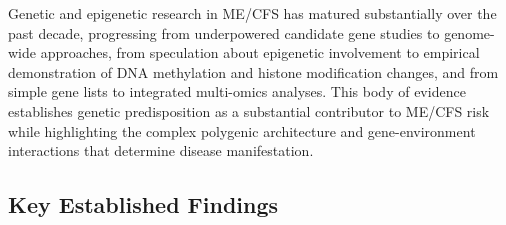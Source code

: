 Genetic and epigenetic research in ME/CFS has matured substantially over the past decade, progressing from underpowered candidate gene studies to genome-wide approaches, from speculation about epigenetic involvement to empirical demonstration of DNA methylation and histone modification changes, and from simple gene lists to integrated multi-omics analyses. This body of evidence establishes genetic predisposition as a substantial contributor to ME/CFS risk while highlighting the complex polygenic architecture and gene-environment interactions that determine disease manifestation.

\subsection{Key Established Findings}

